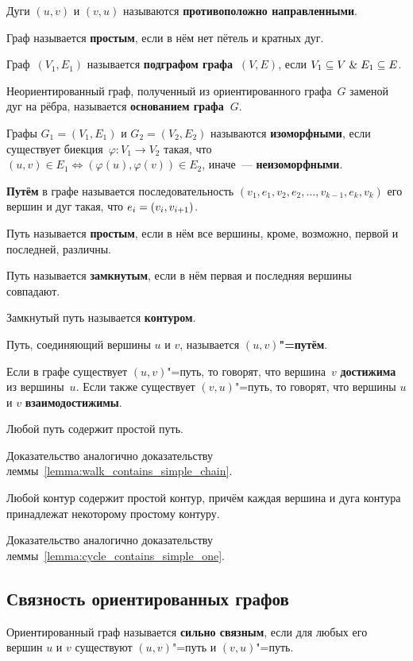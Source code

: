 Дуги $(u, v)$ и $(v, u)$ называются \textbf{противоположно направленными}.

Граф называется \textbf{простым}, если в нём нет пётель и кратных дуг.

Граф~$(V_1, E_1)$ называется \textbf{подграфом графа~$(V, E)$}, если $V_1 \subseteq V \mathrel{\&} E_1 \subseteq E$.

Неориентированный граф, полученный из ориентированного графа~$G$ заменой дуг на рёбра, называется \textbf{основанием графа~$G$}. 

Графы $G_1 = (V_1, E_1)$ и $G_2 = (V_2, E_2)$ называются \textbf{изоморфными}, если существует биекция~$\varphi \colon V_1 \to V_2$ такая, что
$(u, v) \in E_1 \Leftrightarrow (\varphi(u), \varphi(v)) \in E_2$, иначе~--- \textbf{неизоморфными}.

 \textbf{Путём} в графе называется последовательность $(v_1, e_1, v_2, e_2, \ldots, v_{k-1}, e_k, v_k)$ его вершин и дуг такая, что $e_i \opbr= (v_i, v_{i+1})$.

Путь называется \textbf{простым}, если в нём все вершины, кроме, возможно, первой и последней, различны.

Путь называется \textbf{замкнутым}, если в нём первая и последняя вершины совпадают.

 Замкнутый путь называется \textbf{контуром}.

Путь, соединяющий вершины $u$ и $v$, называется \textbf{$(u, v)$"=путём}.

Если в графе существует $(u, v)$"=путь, то говорят, что вершина~$v$ \textbf{достижима} из вершины~$u$.
Если также существует $(v, u)$"=путь, то говорят, что вершины $u$ и $v$ \textbf{взаимодостижимы}.

\begin{lemma}
Любой путь содержит простой путь.
\end{lemma}%
Доказательство аналогично доказательству леммы~\ref{lemma:walk_contains_simple_chain}.

\begin{lemma}
Любой контур содержит простой контур, причём каждая вершина и дуга контура принадлежат некоторому простому контуру.
\end{lemma}%
Доказательство аналогично доказательству леммы~\ref{lemma:cycle_contains_simple_one}.

\subsection{Связность ориентированных графов}
Ориентированный граф называется \textbf{сильно связным}, если для любых его вершин $u$ и $v$ существуют $(u, v)$"=путь и $(v, u)$"=путь.

